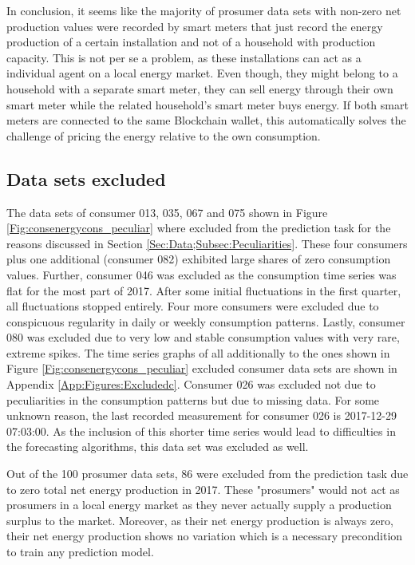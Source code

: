 In conclusion, it seems like the majority of prosumer data sets with non-zero net production values were recorded by smart meters that just record the energy production of a certain installation and not of a household with production capacity. This is not per se a problem, as these installations can act as a individual agent on a local energy market. Even though, they might belong to a household with a separate smart meter, they can sell energy through their own smart meter while the related household's smart meter buys energy. If both smart meters are connected to the same Blockchain wallet, this automatically solves the challenge of pricing the energy relative to the own consumption.


\subsection{Data sets excluded}\label{Sec:Data;Subsec:Exclusion}
The data sets of consumer 013, 035, 067 and 075 shown in Figure \ref{Fig:consenergycons_peculiar} where excluded from the prediction task for the reasons discussed in Section \ref{Sec:Data;Subsec:Peculiarities}. These four consumers plus one additional (consumer 082) exhibited large shares of zero consumption values. Further, consumer 046 was excluded as the consumption time series was flat for the most part of 2017. After some initial fluctuations in the first quarter, all fluctuations stopped entirely. Four more consumers were excluded due to conspicuous regularity in daily or weekly consumption patterns. Lastly, consumer 080 was excluded due to very low and stable consumption values with very rare, extreme spikes. The time series graphs of all additionally to the ones shown in Figure \ref{Fig:consenergycons_peculiar} excluded consumer data sets are shown in Appendix \ref{App:Figures:Excludedc}. Consumer 026 was excluded not due to peculiarities in the consumption patterns but due to missing data. For some unknown reason, the last recorded measurement for consumer 026 is 2017-12-29 07:03:00. As the inclusion of this shorter time series would lead to difficulties in the forecasting algorithms, this data set was excluded as well.

Out of the 100 prosumer data sets, 86 were excluded from the prediction task due to zero total net energy production in 2017. These "prosumers" would not act as prosumers in a local energy market as they never actually supply a production surplus to the market. Moreover, as their net energy production is always zero, their net energy production shows no variation which is a necessary precondition to train any prediction model.

